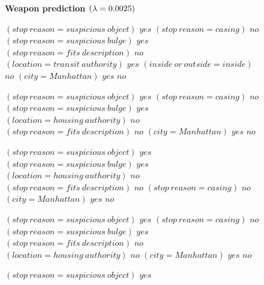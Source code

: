 \begin{figure}[h!]
\textbf{Weapon prediction $({\lambda} = 0.0025)$}
\vspace{0.5mm}
\scriptsize
\begin{algorithmic}
\State \bif $(stop~reason = suspicious~object)$ \bthen $yes$ 
\State \belif $(stop~reason = casing)$ \bthen $no$
\State \belif $(stop~reason = suspicious~bulge)$ \bthen $yes$
\State \belif $(stop~reason = fits~description)$ \bthen $no$
\State \belif $(location = transit~authority)$ \bthen $yes$
\State \belif $(inside~or~outside = inside)$ \bthen $no$
\State \belif $(city = Manhattan)$ \bthen $yes$
\State \belse $no$
\end{algorithmic}
\vspace{0.5mm}
\begin{algorithmic}
\State \bif $(stop~reason = suspicious~object)$ \bthen $yes$ 
\State \belif $(stop~reason = casing)$ \bthen $no$
\State \belif $(stop~reason = suspicious~bulge)$ \bthen $yes$
\State \belif $(location = housing~authority)$ \bthen $no$
\State \belif $(stop~reason = fits~description)$ \bthen $no$
\State \belif $(city = Manhattan)$ \bthen $yes$
\State \belse $no$
\end{algorithmic}
\vspace{0.5mm}
\begin{algorithmic}
\State \bif $(stop~reason = suspicious~object)$ \bthen $yes$ 
\State \belif $(stop~reason = suspicious~bulge)$ \bthen $yes$
\State \belif $(location = housing~authority)$ \bthen $no$
\State \belif $(stop~reason = fits~description)$ \bthen $no$
\State \belif $(stop~reason = casing)$ \bthen $no$
\State \belif $(city = Manhattan)$ \bthen $yes$
\State \belse $no$
\end{algorithmic}
\vspace{0.5mm}
\begin{algorithmic}
\State \bif $(stop~reason = suspicious~object)$ \bthen $yes$ 
\State \belif $(stop~reason = casing)$ \bthen $no$
\State \belif $(stop~reason = suspicious~bulge)$ \bthen $yes$
\State \belif $(stop~reason = fits~description)$ \bthen $no$
\State \belif $(location = housing~authority)$ \bthen $no$
\State \belif $(city = Manhattan)$ \bthen $yes$
\State \belse $no$
\end{algorithmic}
\vspace{0.5mm}
\begin{algorithmic}
\State \bif $(stop~reason = suspicious~object)$ \bthen $yes$ 

\end{algorithmic}
\end{figure}
